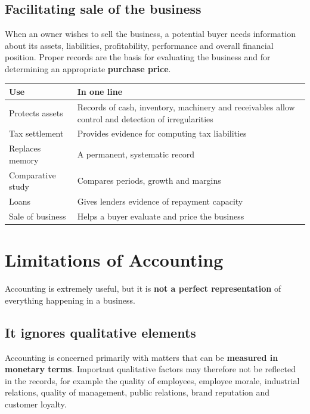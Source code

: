 \documentclass[11pt,a4paper]{article}
\begin{document}
\subsection{Facilitating sale of the business}
When an owner wishes to sell the business, a potential buyer needs information about its assets,
liabilities, profitability, performance and overall financial position. Proper records are the
basis for evaluating the business and for determining an appropriate \textbf{purchase price}.

\begin{center}
\small
\begin{tabularx}{\textwidth}{@{}l Y@{}}
\toprule
{}\textbf{Use} & \textbf{In one line}\\
\midrule
Protects assets & Records of cash, inventory, machinery and receivables allow control and detection of irregularities\\
Tax settlement & Provides evidence for computing tax liabilities\\
Replaces memory & A permanent, systematic record\\
Comparative study & Compares periods, growth and margins\\
Loans & Gives lenders evidence of repayment capacity\\
Sale of business & Helps a buyer evaluate and price the business\\
\bottomrule
\end{tabularx}
\end{center}

\section{Limitations of Accounting}

Accounting is extremely useful, but it is \textbf{not a perfect representation} of everything
happening in a business.

\subsection{It ignores qualitative elements}

Accounting is concerned primarily with matters that can be \textbf{measured in monetary terms}.
Important qualitative factors may therefore not be reflected in the records, for example the quality
of employees, employee morale, industrial relations, quality of management, public relations,
brand reputation and customer loyalty.
\end{document}
